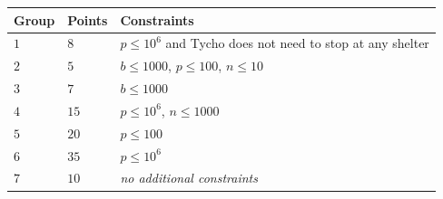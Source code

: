 \medskip
\begin{tabular}{lll}
Group & Points & Constraints \\\hline
  $1$ & $8$  & $p\leq 10^6$ and Tycho does not need to stop at any shelter \\ %
  $2$ & $5$  & $b\leq 1000$, $p\leq 100$, $n\leq 10$ \\
  $3$ & $7$  & $b\leq 1000$ \\
  $4$ & $15$ & $p\leq 10^6$, $n\leq 1000$\\
  $5$ & $20$ & $p\leq 100$\\
  $6$ & $35$ & $p\leq 10^6$\\
  $7$ & $10$ & \emph{no additional constraints}
\end{tabular}
